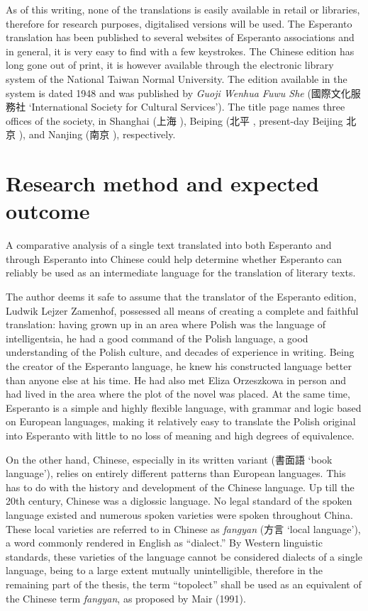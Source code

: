 As of this writing, none of the translations is easily available in retail or libraries, therefore for research purposes, digitalised versions will be used.
The Esperanto translation has been published to several websites of Esperanto associations and in general, it is very easy to find with a few keystrokes.
The Chinese edition has long gone out of print, it is however available through the electronic library system of the National Taiwan Normal University.
The edition available in the system is dated 1948 and was published by \textit{Guoji Wenhua Fuwu She} (國際文化服務社  `International Society for Cultural Services').
The title page names three offices of the society, in Shanghai (上海 ), Beiping (北平 , present-day Beijing 北京 ), and Nanjing (南京 ), respectively.

\section{Research method and expected outcome}

A comparative analysis of a single text translated into both Esperanto and through Esperanto into Chinese could help determine whether Esperanto can reliably be used as an intermediate language for the translation of literary texts.

The author deems it safe to assume that the translator of the Esperanto edition, Ludwik Lejzer Zamenhof, possessed all means of creating a complete and faithful translation: having grown up in an area where Polish was the language of intelligentsia, he had a good command of the Polish language, a good understanding of the Polish culture, and decades of experience in writing.
Being the creator of the Esperanto language, he knew his constructed language better than anyone else at his time.
He had also met Eliza Orzeszkowa in person and had lived in the area where the plot of the novel was placed.
At the same time, Esperanto is a simple and highly flexible language, with grammar and logic based on European languages, making it relatively easy to translate the Polish original into Esperanto with little to no loss of meaning and high degrees of equivalence.

On the other hand, Chinese, especially in its written variant (書面語  `book language'), relies on entirely different patterns than European languages.
This has to do with the history and development of the Chinese language.
Up till the 20th century, Chinese was a diglossic language.
No legal standard of the spoken language existed and numerous spoken varieties were spoken throughout China.
These local varieties are referred to in Chinese as \textit{fangyan} (方言  `local language'), a word commonly rendered in English as ``dialect.''
By Western linguistic standards, these varieties of the language cannot be considered dialects of a single language, being to a large extent mutually unintelligible, therefore in the remaining part of the thesis, the term ``topolect'' shall be used as an equivalent of the Chinese term \textit{fangyan}, as proposed by Mair (1991).

